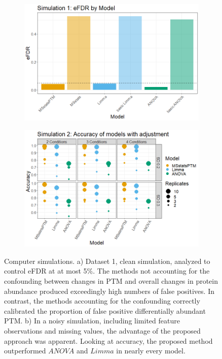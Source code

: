 \documentclass[mcp]{article}
\numberwithin{table}{section}
\begin{document}
\begin{figure}[ht]
\centering
\begin{subfigure}[c]{0.7\linewidth}
\includegraphics[width=1\textwidth]{images/sim1_FDR_all_models.png}
\caption{}
\label{fig:sim1_fdr}
\end{subfigure}
\begin{subfigure}[c]{0.825\linewidth}
\includegraphics[width=1\textwidth]{images/sim3_Accuracy.png}
\caption{}
\label{fig:sim2_acc}
\end{subfigure}
\caption{Computer simulations. a) Dataset 1, clean simulation, analyzed to control eFDR at at most 5\%. The methods not accounting for the confounding between changes in PTM and overall changes in protein abundance produced exceedingly high numbers of false positives. In contrast, the methods accounting for the confounding correctly calibrated the proportion of false positive differentially abundant PTM.  b) In a noisy simulation, including limited feature observations and missing values, the advantage of the proposed approach was apparent. Looking at accuracy, the proposed method outperformed $ANOVA$ and $Limma$ in nearly every model.
}
\label{fig:computer_sim}
\end{figure}
\end{document}
